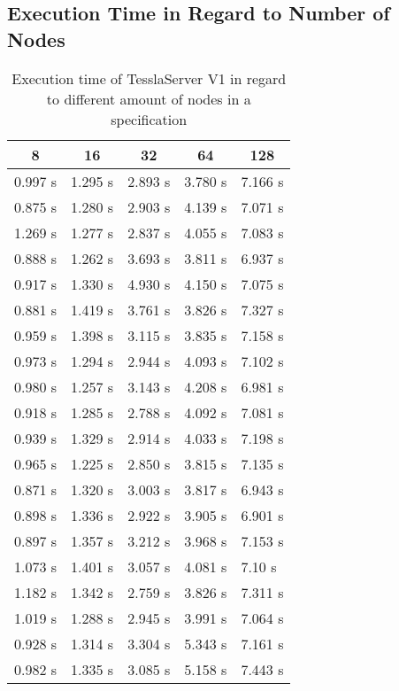 \clearpage

\subsection{Execution Time in Regard to Number of Nodes}
\label{sec:appendix:runtime_benchmark_data:ram_usage_events}

\begin{table}[!htb]
  \centering
  \caption{Execution time of TesslaServer V1 in regard to different amount of nodes in a specification}
  \label{table:tessla_server_v1_num_nodes}
  \begin{tabular}{lllll}
    \multicolumn{1}{c}{8} & \multicolumn{1}{c}{16} & \multicolumn{1}{c}{32} & \multicolumn{1}{c}{64} & \multicolumn{1}{c}{128}\\ \hline
    0.997 s & 1.295 s & 2.893 s & 3.780 s & 7.166 s \\
    0.875 s & 1.280 s & 2.903 s & 4.139 s & 7.071 s \\
    1.269 s & 1.277 s & 2.837 s & 4.055 s & 7.083 s \\
    0.888 s & 1.262 s & 3.693 s & 3.811 s & 6.937 s \\
    0.917 s & 1.330 s & 4.930 s & 4.150 s & 7.075 s \\
    0.881 s & 1.419 s & 3.761 s & 3.826 s & 7.327 s \\
    0.959 s & 1.398 s & 3.115 s & 3.835 s & 7.158 s \\
    0.973 s & 1.294 s & 2.944 s & 4.093 s & 7.102 s \\
    0.980 s & 1.257 s & 3.143 s & 4.208 s & 6.981 s \\
    0.918 s & 1.285 s & 2.788 s & 4.092 s & 7.081 s \\
    0.939 s & 1.329 s & 2.914 s & 4.033 s & 7.198 s \\
    0.965 s & 1.225 s & 2.850 s & 3.815 s & 7.135 s \\
    0.871 s & 1.320 s & 3.003 s & 3.817 s & 6.943 s \\
    0.898 s & 1.336 s & 2.922 s & 3.905 s & 6.901 s \\
    0.897 s & 1.357 s & 3.212 s & 3.968 s & 7.153 s \\
    1.073 s & 1.401 s & 3.057 s & 4.081 s & 7.10 s  \\
    1.182 s & 1.342 s & 2.759 s & 3.826 s & 7.311 s \\
    1.019 s & 1.288 s & 2.945 s & 3.991 s & 7.064 s \\
    0.928 s & 1.314 s & 3.304 s & 5.343 s & 7.161 s \\
    0.982 s & 1.335 s & 3.085 s & 5.158 s & 7.443 s
  \end{tabular}
\end{table}

